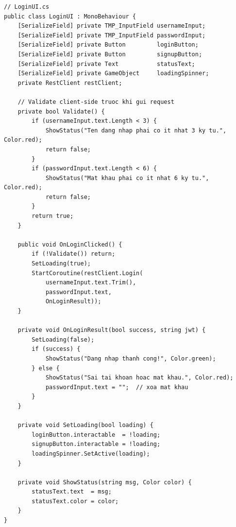 \documentclass[12pt,a4paper]{report}
\begin{document}
\begin{lstlisting}[style=bashStyle, caption={LoginUI --- form đăng nhập có validation}, label={lst:loginui}]
// LoginUI.cs
public class LoginUI : MonoBehaviour {
    [SerializeField] private TMP_InputField usernameInput;
    [SerializeField] private TMP_InputField passwordInput;
    [SerializeField] private Button         loginButton;
    [SerializeField] private Button         signupButton;
    [SerializeField] private Text           statusText;
    [SerializeField] private GameObject     loadingSpinner;
    private RestClient restClient;

    // Validate client-side truoc khi gui request
    private bool Validate() {
        if (usernameInput.text.Length < 3) {
            ShowStatus("Ten dang nhap phai co it nhat 3 ky tu.", Color.red);
            return false;
        }
        if (passwordInput.text.Length < 6) {
            ShowStatus("Mat khau phai co it nhat 6 ky tu.", Color.red);
            return false;
        }
        return true;
    }

    public void OnLoginClicked() {
        if (!Validate()) return;
        SetLoading(true);
        StartCoroutine(restClient.Login(
            usernameInput.text.Trim(),
            passwordInput.text,
            OnLoginResult));
    }

    private void OnLoginResult(bool success, string jwt) {
        SetLoading(false);
        if (success) {
            ShowStatus("Dang nhap thanh cong!", Color.green);
        } else {
            ShowStatus("Sai tai khoan hoac mat khau.", Color.red);
            passwordInput.text = "";  // xoa mat khau
        }
    }

    private void SetLoading(bool loading) {
        loginButton.interactable  = !loading;
        signupButton.interactable = !loading;
        loadingSpinner.SetActive(loading);
    }

    private void ShowStatus(string msg, Color color) {
        statusText.text  = msg;
        statusText.color = color;
    }
}
\end{lstlisting}
\end{document}
